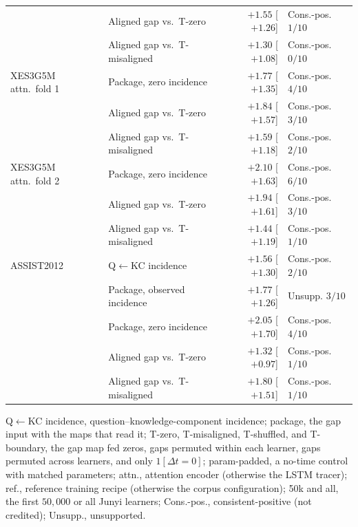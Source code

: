 \begin{table}[tbp]
\begin{tabular}{@{}llrl@{}}
 & Aligned gap vs.\ T-zero & $+1.55$ [$+1.26$] & Cons.-pos. $1/10$ \\
 & Aligned gap vs.\ T-misaligned & $+1.30$ [$+1.08$] & Cons.-pos. $0/10$ \\
\addlinespace[1pt]
XES3G5M attn.\ fold 1 & Package, zero incidence & $+1.77$ [$+1.35$] & Cons.-pos. $4/10$ \\
 & Aligned gap vs.\ T-zero & $+1.84$ [$+1.57$] & Cons.-pos. $3/10$ \\
 & Aligned gap vs.\ T-misaligned & $+1.59$ [$+1.18$] & Cons.-pos. $2/10$ \\
\addlinespace[1pt]
XES3G5M attn.\ fold 2 & Package, zero incidence & $+2.10$ [$+1.63$] & Cons.-pos. $6/10$ \\
 & Aligned gap vs.\ T-zero & $+1.94$ [$+1.61$] & Cons.-pos. $3/10$ \\
 & Aligned gap vs.\ T-misaligned & $+1.44$ [$+1.19$] & Cons.-pos. $1/10$ \\
\addlinespace[1pt]
ASSIST2012 & Q$\leftarrow$KC incidence & $+1.56$ [$+1.30$] & Cons.-pos. $2/10$ \\
 & Package, observed incidence & $+1.77$ [$+1.26$] & Unsupp. $3/10$ \\
 & Package, zero incidence & $+2.05$ [$+1.70$] & Cons.-pos. $4/10$ \\
 & Aligned gap vs.\ T-zero & $+1.32$ [$+0.97$] & Cons.-pos. $1/10$ \\
 & Aligned gap vs.\ T-misaligned & $+1.80$ [$+1.51$] & Cons.-pos. $1/10$ \\
\bottomrule
\end{tabular}

\smallskip
\parbox{0.92\linewidth}{\scriptsize
Q$\leftarrow$KC incidence, question--knowledge-component incidence;
package, the gap input with the maps that read it; T-zero,
T-misaligned, T-shuffled, and T-boundary, the gap map fed zeros, gaps
permuted within each learner, gaps permuted across learners, and only
$1[\Delta t{=}0]$; param-padded, a no-time control with matched
parameters; attn., attention encoder (otherwise the LSTM tracer); ref.,
reference training recipe (otherwise the corpus configuration); 50k
and all, the first $50{,}000$ or all Junyi learners; Cons.-pos.,
consistent-positive (not credited); Unsupp., unsupported.
}
\end{table}

